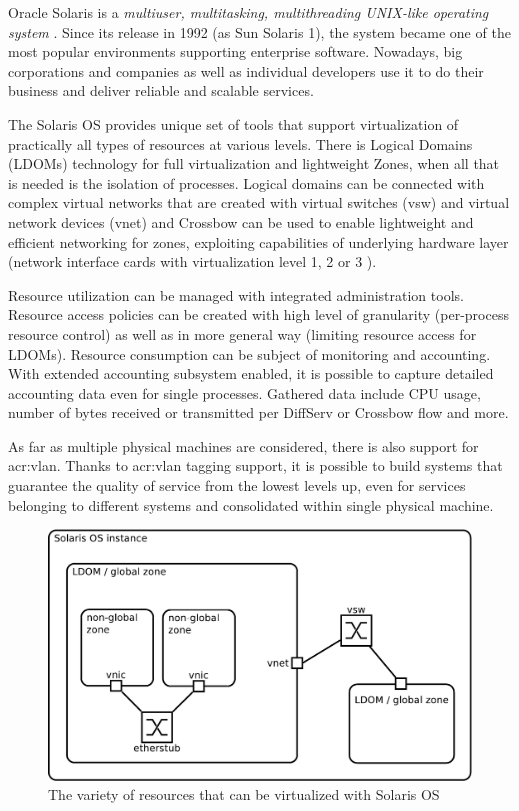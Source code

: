 \documentclass[11pt]{book}
\begin{document}
      Oracle Solaris is a \textit{multiuser, multitasking, multithreading UNIX-like operating system} \cite{reference}.
      Since its release in 1992 (as Sun Solaris 1), the system became one of the most popular environments supporting
      enterprise software. Nowadays, big corporations and companies as well as individual developers use it to do their
      business and deliver reliable and scalable services.

      The Solaris OS provides unique set of tools that support virtualization of practically all types of resources at
      various levels. There is Logical Domains (LDOMs) technology for full virtualization and lightweight Zones, when
      all that is needed is the isolation of processes. Logical domains can be connected with complex virtual networks
      that are created with virtual switches (vsw) and virtual network devices (vnet) \cite{ldomag} and Crossbow can be
      used to enable lightweight and efficient networking for zones, exploiting capabilities of underlying hardware
      layer (network interface cards with virtualization level 1, 2 or 3 \cite{santos}).

      Resource utilization can be managed with integrated administration tools. Resource access policies can be created
      with high level of granularity (per-process resource control) as well as in more general way (limiting resource
      access for LDOMs). Resource consumption can be subject of monitoring and accounting. With extended accounting
      subsystem enabled, it is possible to capture detailed accounting data even for single processes. Gathered data
      include CPU usage, number of bytes received or transmitted per DiffServ or Crossbow flow and more.

      As far as multiple physical machines are considered, there is also support for \gls{acr:vlan}.  Thanks to \gls{acr:vlan}
      tagging support, it is possible to build systems that guarantee the quality of service from the lowest levels up,
      even for services belonging to different systems and consolidated within single physical machine.

      \begin{figure}[H]
        \begin{center}
          \includegraphics[width=.7\textwidth]{img/solaris/full-featured.pdf}
        \end{center}

        \caption{The variety of resources that can be virtualized with Solaris OS}
      \end{figure}
\end{document}
